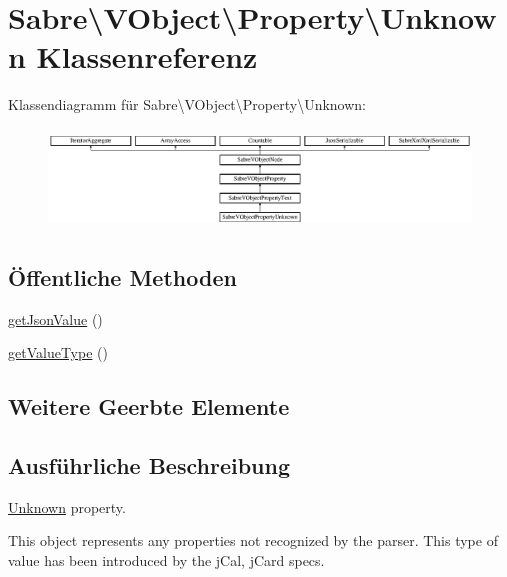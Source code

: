 \hypertarget{class_sabre_1_1_v_object_1_1_property_1_1_unknown}{}\section{Sabre\textbackslash{}V\+Object\textbackslash{}Property\textbackslash{}Unknown Klassenreferenz}
\label{class_sabre_1_1_v_object_1_1_property_1_1_unknown}
Klassendiagramm für Sabre\textbackslash{}V\+Object\textbackslash{}Property\textbackslash{}Unknown\+:\begin{figure}[H]
\begin{center}
\leavevmode
\includegraphics[height=2.641510cm]{class_sabre_1_1_v_object_1_1_property_1_1_unknown}
\end{center}
\end{figure}
\subsection*{Öffentliche Methoden}
\begin{DoxyCompactItemize}
\item 
\mbox{\hyperlink{class_sabre_1_1_v_object_1_1_property_1_1_unknown_af9edb530dc69b930265a328180de39f3}{get\+Json\+Value}} ()
\item 
\mbox{\hyperlink{class_sabre_1_1_v_object_1_1_property_1_1_unknown_a3468d4ec421906fd479b22699a0da16e}{get\+Value\+Type}} ()
\end{DoxyCompactItemize}
\subsection*{Weitere Geerbte Elemente}


\subsection{Ausführliche Beschreibung}
\mbox{\hyperlink{class_sabre_1_1_v_object_1_1_property_1_1_unknown}{Unknown}} property.

This object represents any properties not recognized by the parser. This type of value has been introduced by the j\+Cal, j\+Card specs.


